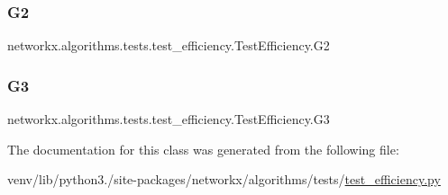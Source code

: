 \subsubsection{\texorpdfstring{G2}{G2}}
{\footnotesize\ttfamily networkx.\+algorithms.\+tests.\+test\+\_\+efficiency.\+Test\+Efficiency.\+G2}

\mbox{\label{classnetworkx_1_1algorithms_1_1tests_1_1test__efficiency_1_1TestEfficiency_a561046b15fd784030f9ab02148e97b73}} 
\subsubsection{\texorpdfstring{G3}{G3}}
{\footnotesize\ttfamily networkx.\+algorithms.\+tests.\+test\+\_\+efficiency.\+Test\+Efficiency.\+G3}



The documentation for this class was generated from the following file\+:\begin{DoxyCompactItemize}
\item 
venv/lib/python3./site-\/packages/networkx/algorithms/tests/\hyperlink{test__efficiency_8py}{test\+\_\+efficiency.\+py}\end{DoxyCompactItemize}
